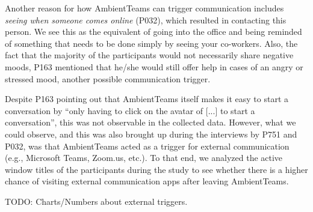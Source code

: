 Another reason for how AmbientTeams can trigger communication includes \textit{seeing when someone comes online} (P032), which resulted in contacting this person. We see this as the equivalent of going into the office and being reminded of something that needs to be done simply by seeing your co-workers. Also, the fact that the majority of the participants would not necessarily share negative moods, P163 mentioned that he/she would still offer help in cases of an angry or stressed mood, another possible communication trigger.

Despite P163 pointing out that AmbientTeams itself makes it easy to start a conversation by \enquote{only having to click on the avatar of [...] to start a conversation}, this was not observable in the collected data. However, what we could observe, and this was also brought up during the interviews by P751 and P032, was that AmbientTeams acted as a trigger for external communication (e.g., Microsoft Teams, Zoom.us, etc.). To that end, we analyzed the active window titles of the participants during the study to see whether there is a higher chance of visiting external communication apps after leaving AmbientTeams.

TODO: Charts/Numbers about external triggers.








